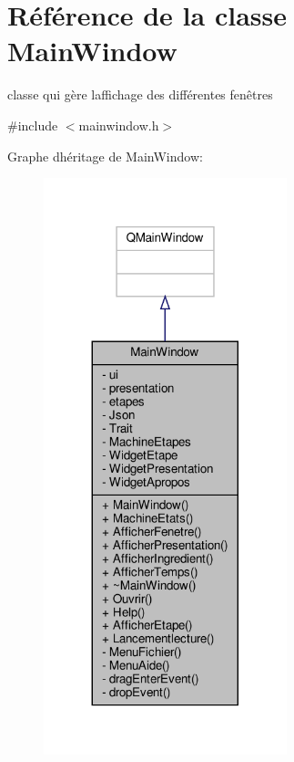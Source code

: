\hypertarget{class_main_window}{}\section{Référence de la classe Main\+Window}
\label{class_main_window}


classe qui gère l\textquotesingle{}affichage des différentes fenêtres  




{\ttfamily \#include $<$mainwindow.\+h$>$}



Graphe d\textquotesingle{}héritage de Main\+Window\+:
\nopagebreak
\begin{figure}[H]
\begin{center}
\leavevmode
\includegraphics[width=200pt]{class_main_window__inherit__graph}
\end{center}
\end{figure}


